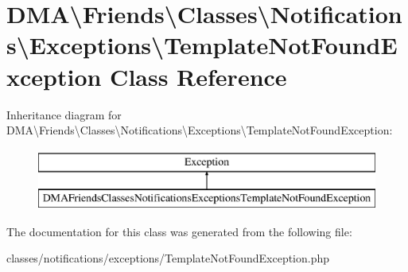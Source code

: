 \hypertarget{classDMA_1_1Friends_1_1Classes_1_1Notifications_1_1Exceptions_1_1TemplateNotFoundException}{\section{D\+M\+A\textbackslash{}Friends\textbackslash{}Classes\textbackslash{}Notifications\textbackslash{}Exceptions\textbackslash{}Template\+Not\+Found\+Exception Class Reference}
\label{classDMA_1_1Friends_1_1Classes_1_1Notifications_1_1Exceptions_1_1TemplateNotFoundException}
}
Inheritance diagram for D\+M\+A\textbackslash{}Friends\textbackslash{}Classes\textbackslash{}Notifications\textbackslash{}Exceptions\textbackslash{}Template\+Not\+Found\+Exception\+:\begin{figure}[H]
\begin{center}
\leavevmode
\includegraphics[height=2.000000cm]{d6/dc3/classDMA_1_1Friends_1_1Classes_1_1Notifications_1_1Exceptions_1_1TemplateNotFoundException}
\end{center}
\end{figure}


The documentation for this class was generated from the following file\+:\begin{DoxyCompactItemize}
\item 
classes/notifications/exceptions/Template\+Not\+Found\+Exception.\+php\end{DoxyCompactItemize}

